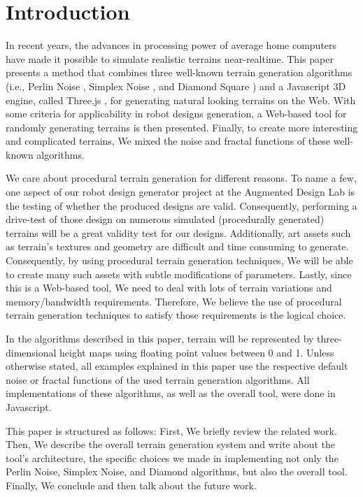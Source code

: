 \section{Introduction} %
\label{sec:introduction}

In recent years, the advances in processing power of average home computers have made it possible to simulate realistic terrains near-realtime. This paper presents a method that combines three well-known terrain generation algorithms (i.e., Perlin Noise  \cite{perlin:2002}, Simplex Noise \cite{perlin:2001}, and Diamond Square \cite{fournier:1982}) and a Javascript 3D engine, called Three.js \cite{threeJS}, for generating natural looking terrains on the Web. With some criteria for applicability in robot designs generation, a Web-based tool for randomly generating terrains is then presented. Finally, to create more interesting and complicated terrains, We mixed the noise and fractal functions of these well-known algorithms.     

We care about procedural terrain generation for different reasons. To name a few, one aspect of our robot design generator project at the Augmented Design Lab is the testing of whether the produced designs are valid. Consequently, performing a drive-test of those design on numerous simulated (procedurally generated) terrains will be a great validity test for our designs. Additionally, art assets such as terrain's textures and geometry are difficult and time consuming to generate. Consequently, by using procedural terrain generation techniques, We will be able to create many such assets with subtle modifications of parameters. Lastly, since this is a Web-based tool, We need to deal with lots of terrain variations and memory/bandwidth requirements. Therefore, We believe the use of procedural terrain generation techniques to satisfy those requirements is the logical choice.    

In the algorithms described in this paper, terrain will be represented by three-dimensional height maps using floating point values between 0 and 1. Unless otherwise stated, all examples explained in this paper use the respective default noise or fractal functions of the used terrain generation algorithms. All implementations of these algorithms, as well as the overall tool, were done in Javascript.  

This paper is structured as follows: First, We briefly review the related work. Then, We describe the overall terrain generation system and write about the tool's architecture, the specific choices we made in implementing not only the Perlin Noise, Simplex Noise, and Diamond algorithms, but also the overall tool. Finally, We conclude and then talk about the future work.  

